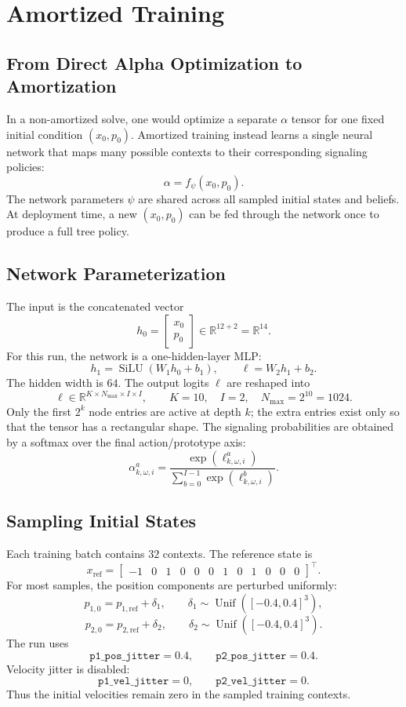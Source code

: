 \documentclass[11pt]{article}
\newcommand{\R}{\mathbb{R}}
\begin{document}
\section{Amortized Training}

\subsection{From Direct Alpha Optimization to Amortization}

In a non-amortized solve, one would optimize a separate $\alpha$ tensor for
one fixed initial condition $(x_0,p_0)$.  Amortized training instead learns a
single neural network that maps many possible contexts to their corresponding
signaling policies:
\[
    \alpha = f_\psi(x_0,p_0).
\]
The network parameters $\psi$ are shared across all sampled initial states and
beliefs.  At deployment time, a new $(x_0,p_0)$ can be fed through the network
once to produce a full tree policy.

\subsection{Network Parameterization}

The input is the concatenated vector
\[
    h_0 =
    \begin{bmatrix}
        x_0 \\ p_0
    \end{bmatrix}
    \in \R^{12+2}=\R^{14}.
\]
For this run, the network is a one-hidden-layer MLP:
\[
    h_1 = \operatorname{SiLU}(W_1h_0+b_1),
    \qquad
    \ell = W_2h_1+b_2.
\]
The hidden width is $64$.  The output logits $\ell$ are reshaped into
\[
    \ell
    \in
    \R^{K \times N_{\max}\times I\times I},
    \qquad
    K=10,\quad I=2,\quad N_{\max}=2^{10}=1024.
\]
Only the first $2^k$ node entries are active at depth $k$; the extra entries
exist only so that the tensor has a rectangular shape.  The signaling
probabilities are obtained by a softmax over the final action/prototype axis:
\[
    \alpha_{k,\omega,i}^{a}
    =
    \frac{
        \exp(\ell_{k,\omega,i}^{a})
    }{
        \sum_{b=0}^{I-1}\exp(\ell_{k,\omega,i}^{b})
    }.
\]

\subsection{Sampling Initial States}

Each training batch contains $32$ contexts.  The reference state is
\[
    x_{\mathrm{ref}} =
    \begin{bmatrix}
    -1 & 0 & 1 & 0 & 0 & 0 &
     1 & 0 & 1 & 0 & 0 & 0
    \end{bmatrix}^{\!\top}.
\]
For most samples, the position components are perturbed uniformly:
\[
    p_{1,0} = p_{1,\mathrm{ref}} + \delta_1,
    \qquad
    \delta_1 \sim \operatorname{Unif}([-0.4,0.4]^3),
\]
\[
    p_{2,0} = p_{2,\mathrm{ref}} + \delta_2,
    \qquad
    \delta_2 \sim \operatorname{Unif}([-0.4,0.4]^3).
\]
The run uses
\[
    \texttt{p1\_pos\_jitter}=0.4,
    \qquad
    \texttt{p2\_pos\_jitter}=0.4.
\]
Velocity jitter is disabled:
\[
    \texttt{p1\_vel\_jitter}=0,
    \qquad
    \texttt{p2\_vel\_jitter}=0.
\]
Thus the initial velocities remain zero in the sampled training contexts.
\end{document}
